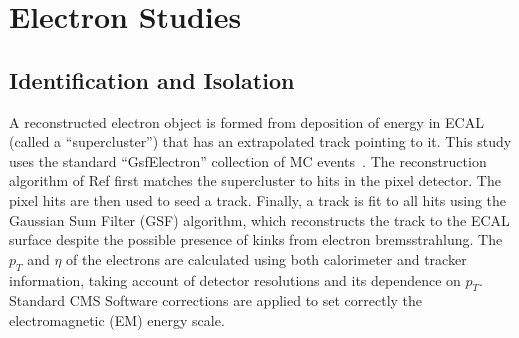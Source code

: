 %

\section{Electron Studies} \label{sec:electrons}

\subsection{Identification and Isolation} \label{sec:IdAndIso}

A reconstructed electron object is formed from deposition of energy in ECAL (called a ``supercluster'') that has an 
extrapolated track pointing to it. This study uses the standard ``GsfElectron'' collection of MC events~\cite{GSFele}.
The reconstruction algorithm of Ref \cite{GSFele} first matches the supercluster to hits in the pixel detector.
The pixel hits are then used to seed a track.  Finally, a track is fit to all hits using the Gaussian Sum Filter 
(GSF) algorithm, which reconstructs the track to the ECAL surface
despite the possible presence of kinks from electron bremsstrahlung.  
The $p_{T}$ and $\eta$ of the electrons are calculated using both calorimeter and tracker information, 
taking account of detector resolutions and its dependence on $p_{T}$.
Standard CMS Software corrections are applied to set correctly the electromagnetic (EM) energy scale.



